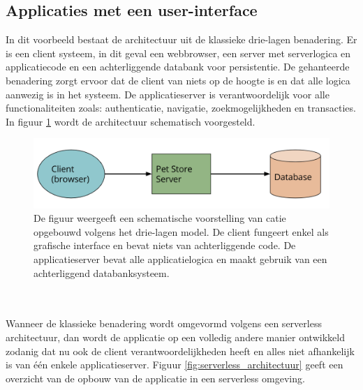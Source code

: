 \subsection{Applicaties met een user-interface}
In dit voorbeeld bestaat de architectuur uit de klassieke drie-lagen benadering. Er is een client systeem, in dit geval een webbrowser, een server met serverlogica en applicatiecode en een achterliggende databank voor persistentie. De gehanteerde benadering zorgt ervoor dat de client van niets op de hoogte is en dat alle logica aanwezig is in het systeem. De applicatieserver is verantwoordelijk voor alle functionaliteiten zoals: authenticatie, navigatie, zoekmogelijkheden en transacties. In figuur \ref{fig:drielagen_architectuur} wordt de architectuur schematisch voorgesteld.
\begin{figure}
    \includegraphics[width=1\textwidth]{img/drielagen_architectuur.png}
    \caption{De figuur weergeeft een schematische voorstelling van catie opgebouwd volgens het drie-lagen model. De client fungeert enkel als grafische interface en bevat niets van achterliggende code. De applicatieserver bevat alle applicatielogica en maakt gebruik van een achterliggend databanksysteem. \autocite{Roberts2018}} 
    \label{fig:drielagen_architectuur}  
\end{figure}
\\\\
Wanneer de klassieke benadering wordt omgevormd volgens een serverless architectuur, dan wordt de applicatie op een volledig andere manier ontwikkeld zodanig dat nu ook de client verantwoordelijkheden heeft en alles niet afhankelijk is van één enkele applicatieserver. Figuur \ref{fig:serverless_architectuur} geeft een overzicht van de opbouw van de applicatie in een serverless omgeving.
